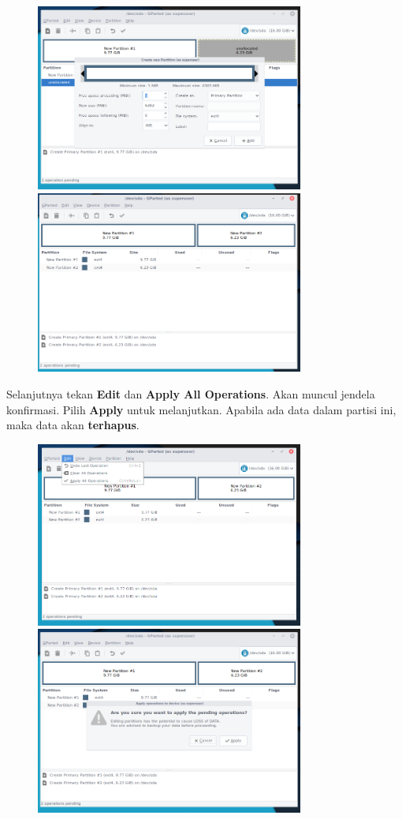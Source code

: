 \documentclass[12pt,]{article}
\begin{document}
	\begin{figure}[!ht]
		\centering
		\includegraphics[width=250pt]{installhdd/step_10}
		\includegraphics[width=250pt]{installhdd/step_11}
	\end{figure}

	Selanjutnya tekan \textbf{Edit} dan \textbf{Apply All Operations}.
	Akan muncul jendela konfirmasi. 
	Pilih \textbf{Apply} untuk melanjutkan.
	Apabila ada data dalam partisi ini, maka data akan \textbf{terhapus}.
	
	\newpage
	\begin{figure}[!ht]
		\centering
		\includegraphics[width=250pt]{installhdd/step_12}
		\includegraphics[width=250pt]{installhdd/step_13}
	\end{figure}
\end{document}
